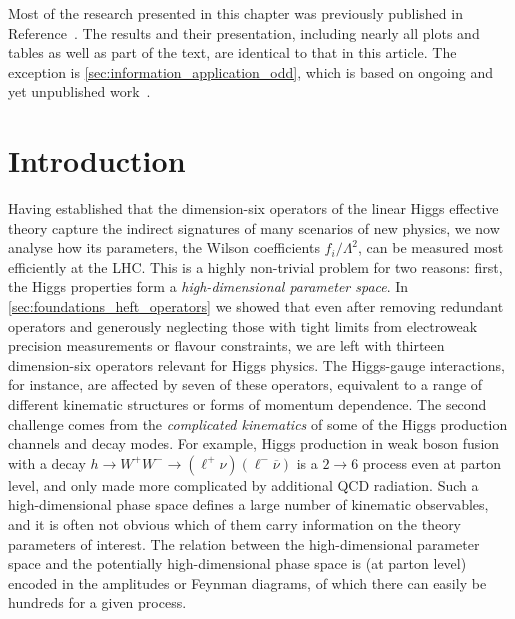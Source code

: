Most of the research presented in this chapter was previously
published in Reference~\cite{Brehmer:2016nyr}. The results and their
presentation, including nearly all plots and tables as well as part of
the text, are identical to that in this article. The exception is
\autoref{sec:information_application_odd}, which is based on ongoing
and yet unpublished work~\cite{Brehmer:CPV_information}.



\section{Introduction}
\label{sec:information_intro}

Having established that the dimension-six operators of the linear
Higgs effective theory capture the indirect signatures of many
scenarios of new physics, we now analyse how its parameters, the
Wilson coefficients $f_i/\Lambda^2$, can be measured most efficiently
at the LHC. This is a highly non-trivial problem for two reasons:
first, the Higgs properties form a \emph{high-dimensional parameter
  space}. In \autoref{sec:foundations_heft_operators} we showed that
even after removing redundant operators and generously neglecting
those with tight limits from electroweak precision measurements or
flavour constraints, we are left with thirteen dimension-six operators
relevant for Higgs physics. The Higgs-gauge interactions, for
instance, are affected by seven of these operators, equivalent to a
range of different kinematic structures or forms of momentum
dependence. The second challenge comes from the \emph{complicated
  kinematics} of some of the Higgs production channels and decay
modes. For example, Higgs production in weak boson fusion with a decay
$h \to W^+W^- \to (\ell^+ \nu) (\ell^- \overbar{\nu})$ is a $2 \to 6$
process even at parton level, and only made more complicated by
additional QCD radiation. Such a high-dimensional phase space defines
a large number of kinematic observables, and it is often not obvious
which of them carry information on the theory parameters of
interest. The relation between the high-dimensional parameter space
and the potentially high-dimensional phase space is (at parton level)
encoded in the amplitudes or Feynman diagrams, of which there can
easily be hundreds for a given process.


